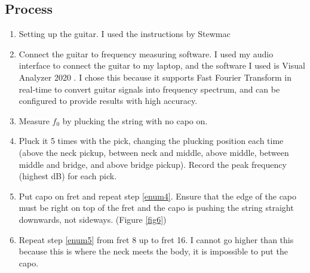 \documentclass[11pt]{article}
\begin{document}
\begin{flushleft}
        \subsection{Process}
            \begin{enumerate}
                \item Setting up the guitar. I used the instructions by Stewmac \cite{stewmac}
                \item Connect the guitar to frequency measuring software. I used my audio interface to connect the guitar to my laptop, and the software I used is Visual Analyzer 2020 \cite{va20}. I chose this because it supports Fast Fourier Transform in real-time to convert guitar signals into frequency spectrum, and can be configured to provide results with high accuracy. 
                \item Measure $f_0$ by plucking the string with no capo on.
                \item Pluck it 5 times with the pick, changing the plucking position each time (above the neck pickup, between neck and middle, above middle, between middle and bridge, and above bridge pickup). Record the peak frequency (highest dB) for each pick. \label{enum4}
                \item Put capo on  fret and repeat step \ref{enum4}. Ensure that the edge of the capo must be right on top of the fret and the capo is pushing the string straight downwards, not sideways. (Figure \ref{fig6})\label{enum5}
                \item Repeat step \ref{enum5} from fret 8 up to fret 16. I cannot go higher than this because this is where the neck meets the body, it is impossible to put the capo.
            \end{enumerate}
            \newpage

\end{flushleft}
\end{document}
